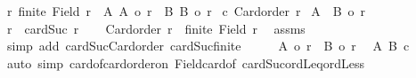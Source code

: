 \begin{isabellebody}
\ r{\isacharcolon}{\kern0pt}\ {\isachardoublequoteopen}{\isasymnot}finite\ {\isacharparenleft}{\kern0pt}Field\ r{\isacharparenright}{\kern0pt}{\isachardoublequoteclose}\ \ A{\isacharcolon}{\kern0pt}\ {\isachardoublequoteopen}{\isacharbar}{\kern0pt}A{\isacharbar}{\kern0pt}\ {\isasymle}o\ r{\isachardoublequoteclose}\ \ B{\isacharcolon}{\kern0pt}\ {\isachardoublequoteopen}{\isacharbar}{\kern0pt}B{\isacharbar}{\kern0pt}\ {\isasymle}o\ r{\isachardoublequoteclose}\isanewline
{}\ c{\isacharcolon}{\kern0pt}\ {\isachardoublequoteopen}Card{\isacharunderscore}{\kern0pt}order\ r{\isachardoublequoteclose}\isanewline
{}\ {\isachardoublequoteopen}{\isacharbar}{\kern0pt}A\ {\isacharless}{\kern0pt}{\isacharplus}{\kern0pt}{\isachargreater}{\kern0pt}\ B{\isacharbar}{\kern0pt}\ {\isasymle}o\ r{\isachardoublequoteclose}\isanewline
%
\isadelimproof
%
\endisadelimproof
%
\isatagproof
{}\isamarkupfalse%
{\isacharminus}{\kern0pt}\isanewline
\ \ \isamarkupfalse%
\ {\isacharquery}{\kern0pt}r{\isacharprime}{\kern0pt}\ {\isacharequal}{\kern0pt}\ {\isachardoublequoteopen}cardSuc\ r{\isachardoublequoteclose}\isanewline
\ \ \isamarkupfalse%
\ {\isachardoublequoteopen}Card{\isacharunderscore}{\kern0pt}order\ {\isacharquery}{\kern0pt}r{\isacharprime}{\kern0pt}\ {\isasymand}\ {\isasymnot}finite\ {\isacharparenleft}{\kern0pt}Field\ {\isacharquery}{\kern0pt}r{\isacharprime}{\kern0pt}{\isacharparenright}{\kern0pt}{\isachardoublequoteclose}\ \isamarkupfalse%
\ assms\isanewline
\ \ \isamarkupfalse%
\ {\isacharparenleft}{\kern0pt}simp\ add{\isacharcolon}{\kern0pt}\ cardSuc{\isacharunderscore}{\kern0pt}Card{\isacharunderscore}{\kern0pt}order\ cardSuc{\isacharunderscore}{\kern0pt}finite{\isacharparenright}{\kern0pt}\isanewline
\ \ \isamarkupfalse%
\ \isamarkupfalse%
\ {\isachardoublequoteopen}{\isacharbar}{\kern0pt}A{\isacharbar}{\kern0pt}\ {\isacharless}{\kern0pt}o\ {\isacharquery}{\kern0pt}r{\isacharprime}{\kern0pt}{\isachardoublequoteclose}\ \ {\isachardoublequoteopen}{\isacharbar}{\kern0pt}B{\isacharbar}{\kern0pt}\ {\isacharless}{\kern0pt}o\ {\isacharquery}{\kern0pt}r{\isacharprime}{\kern0pt}{\isachardoublequoteclose}\ \isamarkupfalse%
\ A\ B\ c\isanewline
\ \ \isamarkupfalse%
\ {\isacharparenleft}{\kern0pt}auto\ simp{\isacharcolon}{\kern0pt}\ card{\isacharunderscore}{\kern0pt}of{\isacharunderscore}{\kern0pt}card{\isacharunderscore}{\kern0pt}order{\isacharunderscore}{\kern0pt}on\ Field{\isacharunderscore}{\kern0pt}card{\isacharunderscore}{\kern0pt}of\ cardSuc{\isacharunderscore}{\kern0pt}ordLeq{\isacharunderscore}{\kern0pt}ordLess{\isacharparenright}{\kern0pt}\isanewline

\end{isabellebody}
